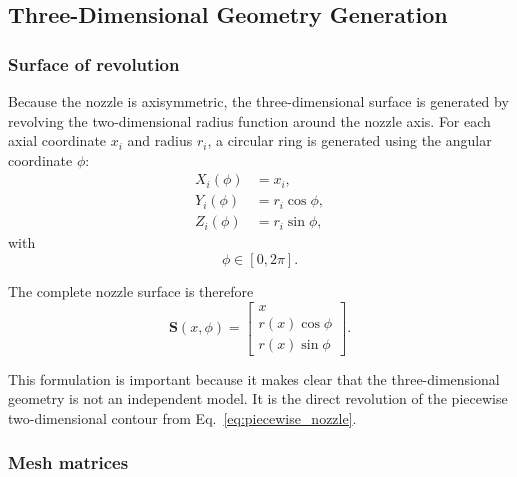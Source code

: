 \documentclass[journal,article,submit,oneauthor]{Definitions/mdpi}
\begin{document}
\subsection{Three-Dimensional Geometry Generation}

\subsubsection{Surface of revolution}

Because the nozzle is axisymmetric, the three-dimensional surface is generated by revolving the two-dimensional radius function around the nozzle axis. For each axial coordinate $x_i$ and radius $r_i$, a circular ring is generated using the angular coordinate $\phi$:
\begin{align}
X_i(\phi)&=x_i,\\
Y_i(\phi)&=r_i\cos\phi,\\
Z_i(\phi)&=r_i\sin\phi,
\end{align}
with
\begin{equation}
\phi\in[0,2\pi].
\end{equation}

The complete nozzle surface is therefore
\begin{equation}
\bm{S}(x,\phi)=
\begin{bmatrix}
x\\
r(x)\cos\phi\\
r(x)\sin\phi
\end{bmatrix}.
\label{eq:surface_of_revolution}
\end{equation}

This formulation is important because it makes clear that the three-dimensional geometry is not an independent model. It is the direct revolution of the piecewise two-dimensional contour from Eq.~\eqref{eq:piecewise_nozzle}.

\subsubsection{Mesh matrices}
\end{document}
